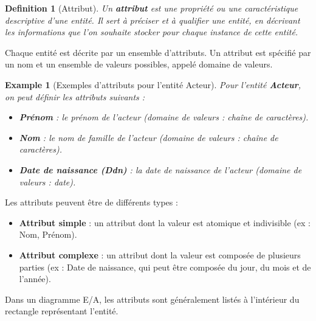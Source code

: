 \documentclass{article}
\newtheorem{definition}{Definition}
\newtheorem{example}{Example}
\begin{document}
\begin{definition}[Attribut]
    Un \textbf{attribut} est une propriété ou une caractéristique descriptive d'une entité.  Il sert à préciser et à qualifier une entité, en décrivant les informations que l'on souhaite stocker pour chaque instance de cette entité.
\end{definition}

Chaque entité est décrite par un ensemble d'attributs.  Un attribut est spécifié par un nom et un ensemble de valeurs possibles, appelé domaine de valeurs.

\begin{example}[Exemples d'attributs pour l'entité Acteur]
    Pour l'entité \textbf{Acteur}, on peut définir les attributs suivants :
    \begin{itemize}
        \item \textbf{Prénom} :  le prénom de l'acteur (domaine de valeurs : chaîne de caractères).
        \item \textbf{Nom} :  le nom de famille de l'acteur (domaine de valeurs : chaîne de caractères).
        \item \textbf{Date de naissance (Ddn)} :  la date de naissance de l'acteur (domaine de valeurs : date).
    \end{itemize}
\end{example}

Les attributs peuvent être de différents types :

\begin{itemize}
    \item \textbf{Attribut simple} :  un attribut dont la valeur est atomique et indivisible (ex : Nom, Prénom).
    \item \textbf{Attribut complexe} :  un attribut dont la valeur est composée de plusieurs parties (ex : Date de naissance, qui peut être composée du jour, du mois et de l'année).
\end{itemize}

Dans un diagramme E/A, les attributs sont généralement listés à l'intérieur du rectangle représentant l'entité.
\end{document}
